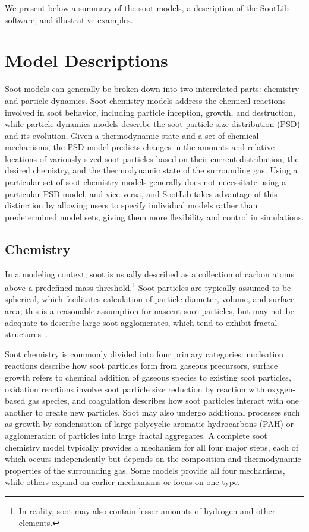 \documentclass[preprint,letterpaper]{elsarticle}
\begin{document}
We present below a summary of the soot models, a description of the SootLib software, and illustrative examples.


\section{Model Descriptions}
\label{s:models}

Soot models can generally be broken down into two interrelated parts: chemistry and particle dynamics. Soot chemistry models address the chemical reactions involved in soot behavior, including particle inception, growth, and destruction, while particle dynamics models describe the soot particle size distribution (PSD) and its evolution. Given a thermodynamic state and a set of chemical mechanisms, the PSD model predicts changes in the amounts and relative locations of variously sized soot particles based on their current distribution, the desired chemistry, and the thermodynamic state of the surrounding gas. Using a particular set of soot chemistry models generally does not necessitate using a particular PSD model, and vice versa, and SootLib takes advantage of this distinction by allowing users to specify individual models rather than predetermined model sets, giving them more flexibility and control in simulations.

\subsection{Chemistry}
\label{s:chemistry}

In a modeling context, soot is usually described as a collection of carbon atoms above a predefined mass threshold.\footnote{In reality, soot may also contain lesser amounts of hydrogen and other elements.} Soot particles are typically assumed to be spherical, which facilitates calculation of particle diameter, volume, and surface area; this is a reasonable assumption for nascent soot particles, but may not be adequate to describe large soot agglomerates, which tend to exhibit fractal structures~\cite{Jullien_1987,Wang_2011}.

Soot chemistry is commonly divided into four primary categories: nucleation reactions describe how soot particles form from gaseous precursors, surface growth refers to chemical addition of gaseous species to existing soot particles, oxidation reactions involve soot particle size reduction by reaction with oxygen-based gas species, and coagulation describes how soot particles interact with one another to create new particles. Soot may also undergo additional processes such as growth by condensation of large polycyclic aromatic hydrocarbons (PAH) or agglomeration of particles into large fractal aggregates. A complete soot chemistry model typically provides a mechanism for all four major steps, each of which occurs independently but depends on the composition and thermodynamic properties of the surrounding gas. Some models provide all four mechanisms, while others expand on earlier mechanisms or focus on one type.
\end{document}
